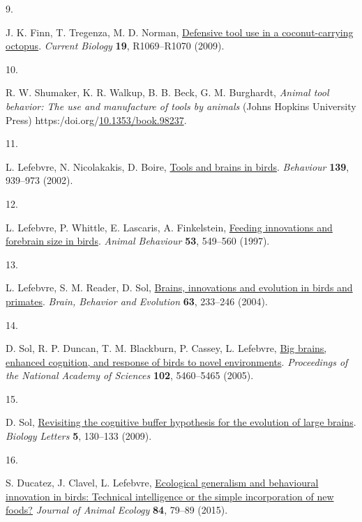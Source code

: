 \documentclass[
  man, donotrepeattitle,floatsintext]{apa6}
\newlength{\cslhangindent}
\newlength{\csllabelwidth}
\newlength{\cslentryspacingunit} %
\newenvironment{CSLReferences}[2] %
 {%
  \setlength{\parindent}{0pt}
  \ifodd #1
  \let\oldpar\par
  \def\par{\hangindent=\cslhangindent\oldpar}
  \fi
  \setlength{\parskip}{#2\cslentryspacingunit}
 }%
 {}
\newcommand{\CSLLeftMargin}[1]{\parbox[t]{\csllabelwidth}{#1}}
\newcommand{\CSLRightInline}[1]{\parbox[t]{\linewidth - \csllabelwidth}{#1}\break}
\begin{document}
\begin{CSLReferences}{0}{0}
\leavevmode{}%
\CSLLeftMargin{9. }%
\CSLRightInline{J. K. Finn, T. Tregenza, M. D. Norman, \href{https://doi.org/10.1016/j.cub.2009.10.052}{Defensive tool use in a coconut-carrying octopus}. \emph{Current Biology} \textbf{19}, R1069--R1070 (2009).}

\leavevmode{}%
\CSLLeftMargin{10. }%
\CSLRightInline{R. W. Shumaker, K. R. Walkup, B. B. Beck, G. M. Burghardt, \emph{Animal tool behavior: The use and manufacture of tools by animals} (Johns Hopkins University Press) https:/doi.org/\href{https://doi.org/10.1353/book.98237}{10.1353/book.98237}.}

\leavevmode{}%
\CSLLeftMargin{11. }%
\CSLRightInline{L. Lefebvre, N. Nicolakakis, D. Boire, \href{https://doi.org/10.1163/156853902320387918}{Tools and brains in birds}. \emph{Behaviour} \textbf{139}, 939--973 (2002).}

\leavevmode{}%
\CSLLeftMargin{12. }%
\CSLRightInline{L. Lefebvre, P. Whittle, E. Lascaris, A. Finkelstein, \href{https://doi.org/10.1006/anbe.1996.0330}{Feeding innovations and forebrain size in birds}. \emph{Animal Behaviour} \textbf{53}, 549--560 (1997).}

\leavevmode{}%
\CSLLeftMargin{13. }%
\CSLRightInline{L. Lefebvre, S. M. Reader, D. Sol, \href{https://doi.org/10.1159/000076784}{Brains, innovations and evolution in birds and primates}. \emph{Brain, Behavior and Evolution} \textbf{63}, 233--246 (2004).}

\leavevmode{}%
\CSLLeftMargin{14. }%
\CSLRightInline{D. Sol, R. P. Duncan, T. M. Blackburn, P. Cassey, L. Lefebvre, \href{https://doi.org/10.1073/pnas.0408145102}{Big brains, enhanced cognition, and response of birds to novel environments}. \emph{Proceedings of the National Academy of Sciences} \textbf{102}, 5460--5465 (2005).}

\leavevmode{}%
\CSLLeftMargin{15. }%
\CSLRightInline{D. Sol, \href{https://doi.org/10.1098/rsbl.2008.0621}{Revisiting the cognitive buffer hypothesis for the evolution of large brains}. \emph{Biology Letters} \textbf{5}, 130--133 (2009).}

\leavevmode{}%
\CSLLeftMargin{16. }%
\CSLRightInline{S. Ducatez, J. Clavel, L. Lefebvre, \href{https://doi.org/10.1111/1365-2656.12255}{Ecological generalism and behavioural innovation in birds: Technical intelligence or the simple incorporation of new foods?} \emph{Journal of Animal Ecology} \textbf{84}, 79--89 (2015).}


\end{CSLReferences}
\end{document}
